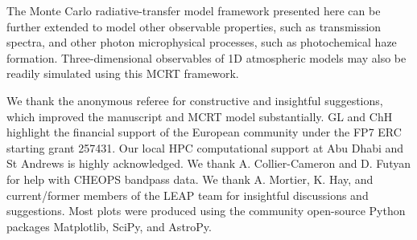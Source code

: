 \documentclass{aa}
\begin{document}
The Monte Carlo radiative-transfer model framework presented here can be further extended to model other observable properties, such as transmission spectra, and other photon microphysical processes, such as photochemical haze formation.
Three-dimensional observables of 1D atmospheric models may also be readily simulated using this MCRT framework.


\begin{acknowledgements}
We thank the anonymous referee for constructive and insightful suggestions, which improved the manuscript and MCRT model substantially.
GL and ChH highlight the financial support of the European community under the FP7 ERC starting grant 257431.
Our local HPC computational support at Abu Dhabi and St Andrews is highly acknowledged.
We thank A. Collier-Cameron and D. Futyan for help with CHEOPS bandpass data.
We thank A. Mortier, K. Hay, and current/former members of the LEAP team for insightful discussions and suggestions.
Most plots were produced using the community open-source Python packages Matplotlib, SciPy, and AstroPy.
\end{acknowledgements}



{}
\end{document}
